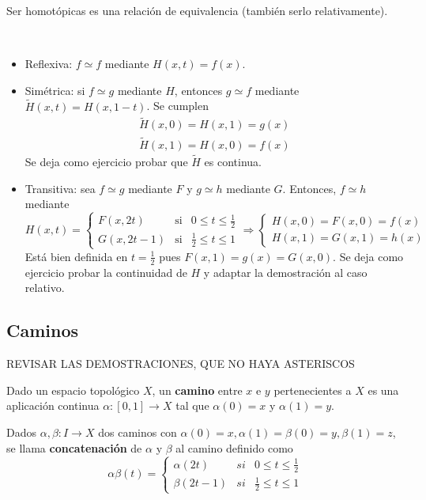 \documentclass[bibtex, anon]{TEMat-article}
\begin{document}
\begin{lema} Ser homotópicas es una relación de equivalencia (también serlo relativamente).
\end{lema}
\begin{demostracion}\
	\begin{itemize}
		\item Reflexiva: $f\simeq f$ mediante $H(x,t)=f(x)$.
		\item Simétrica: si $f\simeq g$ mediante $H$, entonces $g\simeq f$ mediante $\widetilde{H}(x,t)=H(x,1-t)$. Se cumplen
		\begin{gather*}
		\widetilde{H}(x,0)=H(x,1)=g(x)\\
		\widetilde{H}(x,1)=H(x,0)=f(x)
		\end{gather*}
		Se deja como ejercicio probar que $\widetilde{H}$ es continua.
		\item Transitiva: sea $f\simeq g$ mediante $F$ y $g\simeq h$ mediante $G$. Entonces, $f\simeq h$ mediante
		\begin{equation*}
		H(x,t)=\left\{\begin{array}{ccc}
		F(x,2t) & \text{si} & 0\leq t\leq\frac{1}{2}\\
		G(x,2t-1) & \text{si} & \frac{1}{2}\leq t\leq 1
		\end{array}\right.\Longrightarrow\left\{\begin{array}{c}
		H(x,0)=F(x,0)=f(x)\\
		H(x,1)=G(x,1)=h(x)
		\end{array}\right.
		\end{equation*}
		Está bien definida en $t=\frac{1}{2}$ pues $F(x,1)=g(x)=G(x,0)$. Se deja como ejercicio probar la continuidad de $H$ y adaptar la demostración al caso relativo.
	\end{itemize}
\end{demostracion}

\subsection{Caminos}
REVISAR LAS DEMOSTRACIONES, QUE NO HAYA ASTERISCOS 
\begin{definicion}
Dado un espacio topológico $X$, un \textbf{camino} entre $x$ e $y$ pertenecientes a $X$ es una aplicación continua $\alpha:[0,1]\to X$ tal que $\alpha(0)=x$ y $\alpha(1)=y$. %
\end{definicion}

\begin{definicion} Dados $\alpha,\beta:I\to X$ dos caminos con $\alpha(0)=x,\alpha(1)=\beta(0)=y,\beta(1)=z$, se llama \textbf{concatenación} de $\alpha$ y $\beta$ al camino definido como
	\begin{equation*}
	\alpha\beta(t)=\left\{\begin{array}{lcc}
	\alpha(2t) & si & 0\leq t\leq\frac{1}{2}\\
	\beta(2t-1) & si & \frac{1}{2}\leq t\leq 1
	
	\end{array}\right.
	\end{equation*}
\end{definicion}
\end{document}
